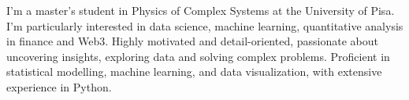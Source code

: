 \begin{cvparagraph}

\vspace{-3mm}
I’m a master's student in Physics of Complex Systems at the University of Pisa.
I’m particularly interested in data science, machine learning, quantitative analysis in finance and Web3. Highly motivated and detail-oriented, passionate about uncovering insights, exploring data and solving complex problems. Proficient in statistical modelling, machine learning, and data visualization, with extensive experience in Python.
\end{cvparagraph}